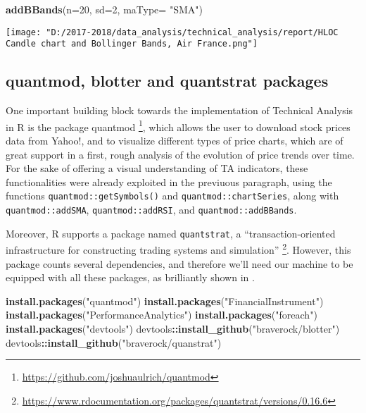 \documentclass[
  11pt,
]{article}
\newenvironment{Shaded}{\begin{snugshade}}{\end{snugshade}}
\newcommand{\DataTypeTok}[1]{\textcolor[rgb]{0.13,0.29,0.53}{#1}}
\newcommand{\DecValTok}[1]{\textcolor[rgb]{0.00,0.00,0.81}{#1}}
\newcommand{\KeywordTok}[1]{\textcolor[rgb]{0.13,0.29,0.53}{\textbf{#1}}}
\newcommand{\NormalTok}[1]{#1}
\newcommand{\OperatorTok}[1]{\textcolor[rgb]{0.81,0.36,0.00}{\textbf{#1}}}
\newcommand{\StringTok}[1]{\textcolor[rgb]{0.31,0.60,0.02}{#1}}
\let\origfigure\figure
\let\endorigfigure\endfigure
\renewenvironment{figure}[1][2] {
    \expandafter\origfigure\expandafter[H]
} {
    \endorigfigure
}
\begin{document}
\begin{Shaded}
\begin{Highlighting}[]
\KeywordTok{addBBands}\NormalTok{(}\DataTypeTok{n=}\DecValTok{20}\NormalTok{, }\DataTypeTok{sd=}\DecValTok{2}\NormalTok{, }\DataTypeTok{maType=} \StringTok{"SMA"}\NormalTok{) }
\end{Highlighting}
\end{Shaded}

\begin{figure}
\centering
\texttt{[image: "D:/2017-2018/data\_analysis/technical\_analysis/report/HLOC Candle chart and Bollinger Bands, Air France.png"]}
\caption{Daily HLOC Chart price with Bollinger Bands (20,2)}
\end{figure}

\hypertarget{quantmod-blotter-and-quantstrat-packages}{%
\subsection{quantmod, blotter and quantstrat
packages}\label{quantmod-blotter-and-quantstrat-packages}}

One important building block towards the implementation of Technical
Analysis in R is the package quantmod \footnote{\url{https://github.com/joshuaulrich/quantmod}},
which allows the user to download stock prices data from Yahoo!, and to
visualize different types of price charts, which are of great support in
a first, rough analysis of the evolution of price trends over time. For
the sake of offering a visual understanding of TA indicators, these
functionalities were already exploited in the previuous paragraph, using
the functions \texttt{quantmod::getSymbols()} and
\texttt{quantmod::chartSeries}, along with \texttt{quantmod::addSMA},
\texttt{quantmod::addRSI}, and \texttt{quantmod::addBBands}.

Moreover, R supports a package named \texttt{quantstrat}, a
``transaction-oriented infrastructure for constructing trading systems
and simulation'' \footnote{\url{https://www.rdocumentation.org/packages/quantstrat/versions/0.16.6}}.
However, this package counts several dependencies, and therefore we'll
need our machine to be equipped with all these packages, as brilliantly
shown in \citet{Yu2019}.

\begin{Shaded}
\begin{Highlighting}[]
\KeywordTok{install.packages}\NormalTok{(}\StringTok{"quantmod"}\NormalTok{)}
\KeywordTok{install.packages}\NormalTok{(}\StringTok{"FinancialInstrument"}\NormalTok{)}
\KeywordTok{install.packages}\NormalTok{(}\StringTok{"PerformanceAnalytics"}\NormalTok{)}
\KeywordTok{install.packages}\NormalTok{(}\StringTok{"foreach"}\NormalTok{)}
\KeywordTok{install.packages}\NormalTok{(}\StringTok{"devtools"}\NormalTok{)}
\NormalTok{devtools}\OperatorTok{::}\KeywordTok{install_github}\NormalTok{(}\StringTok{"braverock/blotter"}\NormalTok{)}
\NormalTok{devtools}\OperatorTok{::}\KeywordTok{install_github}\NormalTok{(}\StringTok{"braverock/quanstrat"}\NormalTok{)}
\end{Highlighting}
\end{Shaded}
\end{document}
